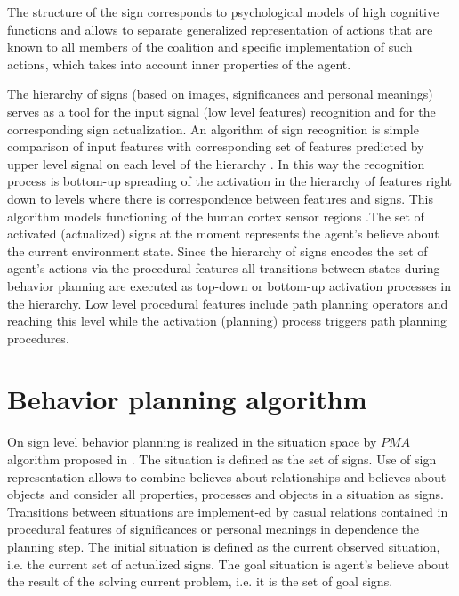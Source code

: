 \documentclass[runningheads,a4paper]{llncs}
\begin{document}
The structure of the sign corresponds to psychological models of high cognitive functions \cite{Vygotsky1986,Leontyev2009} and allows to separate generalized representation of actions that are known to all members of the coalition and specific implementation of such actions, which takes into account inner properties of the agent.

The hierarchy of signs (based on images, significances and personal meanings) serves as a tool for the input signal (low level features) recognition and for the corresponding sign actualization. An algorithm of sign recognition is simple comparison of input features with corresponding set of features predicted by upper level signal on each level of the hierarchy \cite{Osipov2014}. In this way the recognition process is bottom-up spreading of the activation in the hierarchy of features right down to levels where there is correspondence between features and signs. This algorithm models functioning of the human cortex sensor regions \cite{Mountcastle1998,George2009}.The set of activated (actualized) signs at the moment represents the agent's believe about the current environment state. Since the hierarchy of signs encodes the set of agent's actions via the procedural features all transitions between states during behavior planning are executed as top-down or bottom-up activation processes in the hierarchy. Low level procedural features include path planning operators and reaching this level while the activation (planning) process triggers path planning procedures.

\section{Behavior planning algorithm}\label{behavior}

On sign level behavior planning is realized in the situation space by $PMA$ algorithm proposed in \cite{Osipov2015}. The situation is defined as the set of signs. Use of sign representation allows to combine believes about relationships and believes about objects and consider all properties, processes and objects in a situation as signs. Transitions between situations are implement-ed by casual relations contained in procedural features of significances or personal meanings in dependence the planning step. The initial situation is defined as the current observed situation, i.e. the current set of actualized signs. The goal situation is agent's believe about the result of the solving current problem, i.e. it is the set of goal signs.
\end{document}
